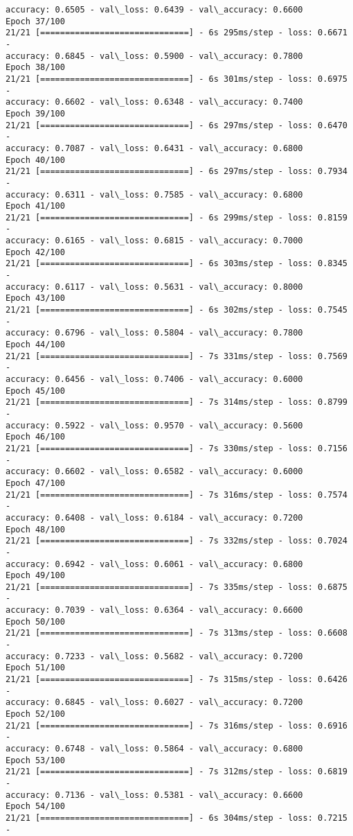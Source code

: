 \documentclass[11pt]{article}
\begin{document}
\begin{Verbatim}[commandchars=\\\{\}]
accuracy: 0.6505 - val\_loss: 0.6439 - val\_accuracy: 0.6600
Epoch 37/100
21/21 [==============================] - 6s 295ms/step - loss: 0.6671 -
accuracy: 0.6845 - val\_loss: 0.5900 - val\_accuracy: 0.7800
Epoch 38/100
21/21 [==============================] - 6s 301ms/step - loss: 0.6975 -
accuracy: 0.6602 - val\_loss: 0.6348 - val\_accuracy: 0.7400
Epoch 39/100
21/21 [==============================] - 6s 297ms/step - loss: 0.6470 -
accuracy: 0.7087 - val\_loss: 0.6431 - val\_accuracy: 0.6800
Epoch 40/100
21/21 [==============================] - 6s 297ms/step - loss: 0.7934 -
accuracy: 0.6311 - val\_loss: 0.7585 - val\_accuracy: 0.6800
Epoch 41/100
21/21 [==============================] - 6s 299ms/step - loss: 0.8159 -
accuracy: 0.6165 - val\_loss: 0.6815 - val\_accuracy: 0.7000
Epoch 42/100
21/21 [==============================] - 6s 303ms/step - loss: 0.8345 -
accuracy: 0.6117 - val\_loss: 0.5631 - val\_accuracy: 0.8000
Epoch 43/100
21/21 [==============================] - 6s 302ms/step - loss: 0.7545 -
accuracy: 0.6796 - val\_loss: 0.5804 - val\_accuracy: 0.7800
Epoch 44/100
21/21 [==============================] - 7s 331ms/step - loss: 0.7569 -
accuracy: 0.6456 - val\_loss: 0.7406 - val\_accuracy: 0.6000
Epoch 45/100
21/21 [==============================] - 7s 314ms/step - loss: 0.8799 -
accuracy: 0.5922 - val\_loss: 0.9570 - val\_accuracy: 0.5600
Epoch 46/100
21/21 [==============================] - 7s 330ms/step - loss: 0.7156 -
accuracy: 0.6602 - val\_loss: 0.6582 - val\_accuracy: 0.6000
Epoch 47/100
21/21 [==============================] - 7s 316ms/step - loss: 0.7574 -
accuracy: 0.6408 - val\_loss: 0.6184 - val\_accuracy: 0.7200
Epoch 48/100
21/21 [==============================] - 7s 332ms/step - loss: 0.7024 -
accuracy: 0.6942 - val\_loss: 0.6061 - val\_accuracy: 0.6800
Epoch 49/100
21/21 [==============================] - 7s 335ms/step - loss: 0.6875 -
accuracy: 0.7039 - val\_loss: 0.6364 - val\_accuracy: 0.6600
Epoch 50/100
21/21 [==============================] - 7s 313ms/step - loss: 0.6608 -
accuracy: 0.7233 - val\_loss: 0.5682 - val\_accuracy: 0.7200
Epoch 51/100
21/21 [==============================] - 7s 315ms/step - loss: 0.6426 -
accuracy: 0.6845 - val\_loss: 0.6027 - val\_accuracy: 0.7200
Epoch 52/100
21/21 [==============================] - 7s 316ms/step - loss: 0.6916 -
accuracy: 0.6748 - val\_loss: 0.5864 - val\_accuracy: 0.6800
Epoch 53/100
21/21 [==============================] - 7s 312ms/step - loss: 0.6819 -
accuracy: 0.7136 - val\_loss: 0.5381 - val\_accuracy: 0.6600
Epoch 54/100
21/21 [==============================] - 6s 304ms/step - loss: 0.7215 -

\end{Verbatim}
\end{document}
